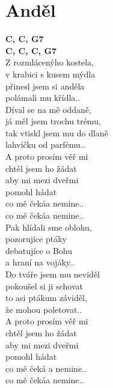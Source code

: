 \section{Anděl}
\onehalfspacing

\begin{multicols}{2}
\singlespacing
\textbf{C, C, G7}\\

\textbf{C, C, C, G7}\\

Z rozmlácenýho kostela,\\
v krabici s kusem mýdla\\
přinesl jsem si anděla\\
polámali mu křídla..\\

Díval se na mě oddaně,\\
já měl jsem trochu trému,\\
tak vtiskl jsem mu do dlaně\\
lahvičku od parfému..\\

{}A proto prosím věř mi\\
chtěl jsem ho žádat\\
aby mi mezi dveřmi\\
pomohl hádat\\
co mě čekáa nemine..\\
co mě čekáa nemine..\\

\sloka
Pak hlídali sme oblohu,\\
pozorujíce ptáky\\
debatujíce o Bohu\\
a hraní na vojáky..\\

Do tváře jsem mu neviděl\\
pokoušel si ji schovat\\
to asi ptákum záviděl,\\
že mohou poletovat..\\

{}A proto prosím věř mi\\
chtěl jsem ho žádat\\
aby mi mezi dveřmi\\
pomohl hádat\\
co mě čeká a nemine..\\
co mě čekáa nemine..\\


\end{multicols}
